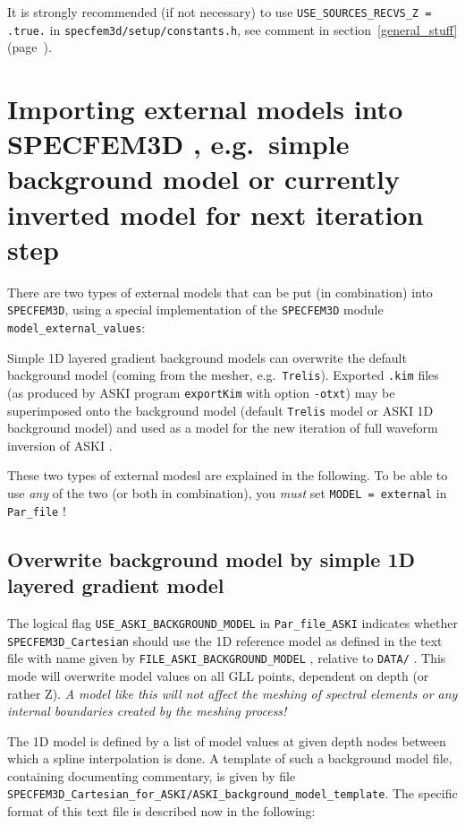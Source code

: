 \documentclass[12pt,a4paper]{article}
\newcommand{\lcode}[1]{\nolinkurl{#1}}
\newcommand{\lcodetitle}[1]{ {\ttfamily #1} }
\newcommand{\ASKI}{ {\ttfamily ASKI} }
\newcommand{\myref}[1]{\ref{#1} (page~\pageref{#1})}
\begin{document}
It is strongly recommended (if not necessary) to use \lcode{USE_SOURCES_RECVS_Z = .true.} in \lcode{specfem3d/setup/constants.h},
see comment in section~\myref{general_stuff}.
%
\section{Importing external models into \lcodetitle{SPECFEM3D}, e.g.\ simple background model or currently inverted model for next iteration step} \label{import_model}
%
There are two types of external models that can be put (in combination) into \lcode{SPECFEM3D}, 
using a special implementation of the \lcode{SPECFEM3D} module \lcode{model_external_values}:

Simple 1D layered gradient background models can overwrite the default background model (coming from the mesher, e.g.\ \lcode{Trelis}).
Exported \lcode{.kim} files (as produced by \ASKI{} program \lcode{exportKim} with option \lcode{-otxt}) may be 
superimposed onto the background model (default \lcode{Trelis} model or \ASKI{} 1D background model) and used as a model for
the new iteration of full waveform inversion of \ASKI{}. 

These two types of external modesl are explained in the following.
To be able to use \emph{any} of the two (or both in combination), you \emph{must} set \lcode{MODEL = external} in \lcode{Par_file} !

\subsection{Overwrite background model by simple 1D layered gradient model} \label{import_model:ssec_1D}
The logical flag \lcode{USE_ASKI_BACKGROUND_MODEL} in \lcode{Par_file_ASKI} indicates whether 
\lcode{SPECFEM3D_Cartesian} should use the 1D reference model as defined in the text file with name given by 
\lcode{FILE_ASKI_BACKGROUND_MODEL} , relative to \lcode{DATA/} .
This mode will overwrite model values on all GLL points, dependent on depth (or rather Z). 
\emph{A model like this will not affect the meshing of spectral elements or any internal boundaries created
by the meshing process!}

The 1D model is defined by a list of model values at given depth nodes between which a spline interpolation 
is done. 
A template of such a background model file, containing documenting commentary, is given by file 
\lcode{SPECFEM3D_Cartesian_for_ASKI/ASKI_background_model_template}.
The specific format of this text file is described now in the following:
\end{document}

